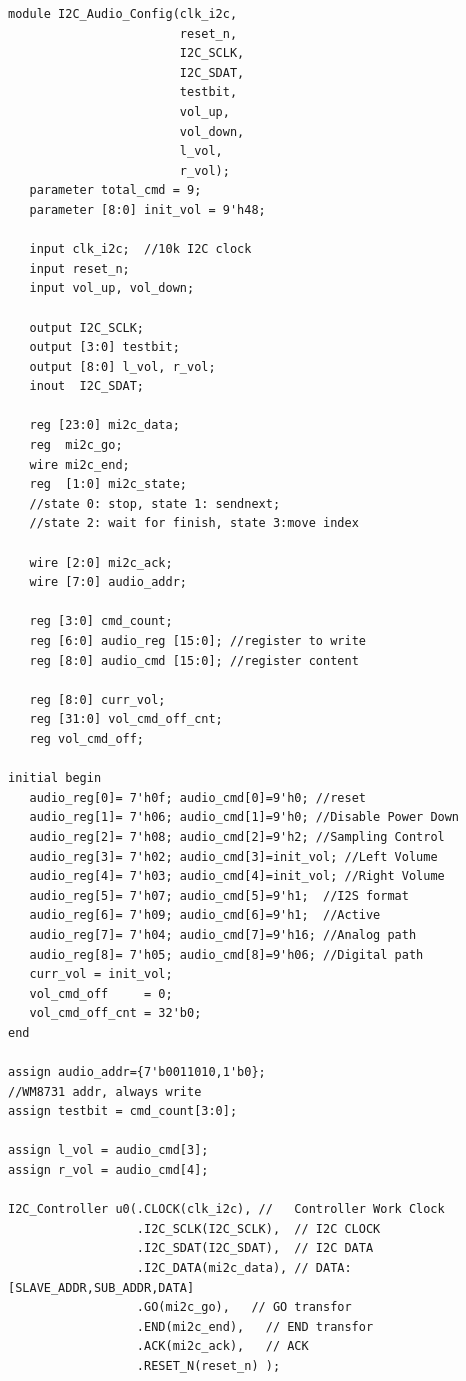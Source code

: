 \documentclass[12pt,a4paper,UTF8]{article}
\begin{document}
\begin{lstlisting}[style=verilog-style]
module I2C_Audio_Config(clk_i2c,
                        reset_n,
                        I2C_SCLK,
                        I2C_SDAT,
                        testbit,
                        vol_up,
                        vol_down,
                        l_vol,
                        r_vol);
   parameter total_cmd = 9;
   parameter [8:0] init_vol = 9'h48;

   input clk_i2c;  //10k I2C clock
   input reset_n;
   input vol_up, vol_down;

   output I2C_SCLK;
   output [3:0] testbit;
   output [8:0] l_vol, r_vol;
   inout  I2C_SDAT;

   reg [23:0] mi2c_data;
   reg  mi2c_go;
   wire mi2c_end;
   reg  [1:0] mi2c_state;
   //state 0: stop, state 1: sendnext;
   //state 2: wait for finish, state 3:move index
   
   wire [2:0] mi2c_ack;
   wire [7:0] audio_addr;

   reg [3:0] cmd_count;
   reg [6:0] audio_reg [15:0]; //register to write
   reg [8:0] audio_cmd [15:0]; //register content
   
   reg [8:0] curr_vol;
   reg [31:0] vol_cmd_off_cnt;
   reg vol_cmd_off;

initial begin
   audio_reg[0]= 7'h0f; audio_cmd[0]=9'h0; //reset
   audio_reg[1]= 7'h06; audio_cmd[1]=9'h0; //Disable Power Down
   audio_reg[2]= 7'h08; audio_cmd[2]=9'h2; //Sampling Control
   audio_reg[3]= 7'h02; audio_cmd[3]=init_vol; //Left Volume
   audio_reg[4]= 7'h03; audio_cmd[4]=init_vol; //Right Volume
   audio_reg[5]= 7'h07; audio_cmd[5]=9'h1;  //I2S format
   audio_reg[6]= 7'h09; audio_cmd[6]=9'h1;  //Active
   audio_reg[7]= 7'h04; audio_cmd[7]=9'h16; //Analog path
   audio_reg[8]= 7'h05; audio_cmd[8]=9'h06; //Digital path
   curr_vol = init_vol;
   vol_cmd_off     = 0;
   vol_cmd_off_cnt = 32'b0;
end

assign audio_addr={7'b0011010,1'b0}; 
//WM8731 addr, always write
assign testbit = cmd_count[3:0];

assign l_vol = audio_cmd[3];
assign r_vol = audio_cmd[4];

I2C_Controller u0(.CLOCK(clk_i2c), //	Controller Work Clock
                  .I2C_SCLK(I2C_SCLK),  // I2C CLOCK
                  .I2C_SDAT(I2C_SDAT),  // I2C DATA
                  .I2C_DATA(mi2c_data), // DATA:[SLAVE_ADDR,SUB_ADDR,DATA]
                  .GO(mi2c_go),   // GO transfor
                  .END(mi2c_end),	// END transfor 
                  .ACK(mi2c_ack),	// ACK
                  .RESET_N(reset_n)	);	
						

\end{lstlisting}
\end{document}
